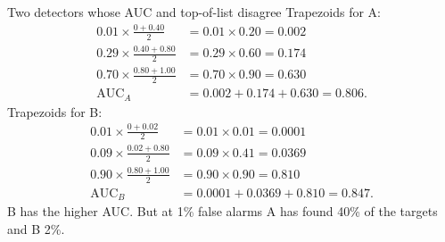 \begin{worked}[label={we:measures:ab}]{Two detectors whose AUC and top-of-list disagree}
Trapezoids for A:
\begin{align*}
0.01 \times \tfrac{0 + 0.40}{2} &= 0.01 \times 0.20 = 0.002\\
0.29 \times \tfrac{0.40 + 0.80}{2} &= 0.29 \times 0.60 = 0.174\\
0.70 \times \tfrac{0.80 + 1.00}{2} &= 0.70 \times 0.90 = 0.630\\
\text{AUC}_A &= 0.002 + 0.174 + 0.630 = 0.806.
\end{align*}
Trapezoids for B:
\begin{align*}
0.01 \times \tfrac{0 + 0.02}{2} &= 0.01 \times 0.01 = 0.0001\\
0.09 \times \tfrac{0.02 + 0.80}{2} &= 0.09 \times 0.41 = 0.0369\\
0.90 \times \tfrac{0.80 + 1.00}{2} &= 0.90 \times 0.90 = 0.810\\
\text{AUC}_B &= 0.0001 + 0.0369 + 0.810 = 0.847.
\end{align*}
B has the higher AUC. But at 1\% false alarms A has found 40\% of the targets and B 2\%.
\end{worked}


